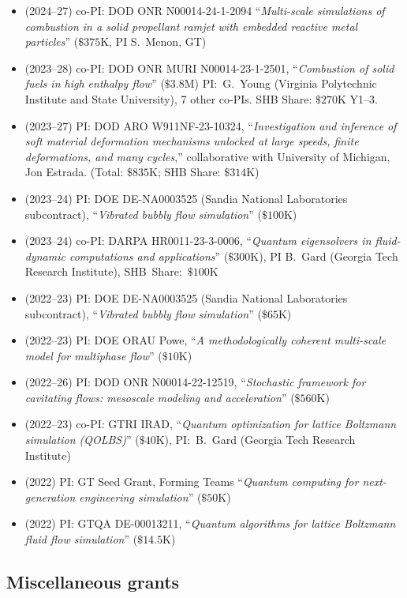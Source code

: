 \begin{itemize}
    \item (2024--27) co-PI: DOD ONR N00014-24-1-2094 ``\textit{Multi-scale simulations of combustion in a solid propellant ramjet with embedded reactive metal particles}'' ($\$375$K, PI S.\ Menon, GT)
    \item (2023--28) co-PI: DOD ONR MURI N00014-23-1-2501, ``\textit{Combustion of solid fuels in high enthalpy flow}'' ($\$3.8$M) PI:~G.~Young (Virginia Polytechnic Institute and State University), 7 other co-PIs. SHB Share: $\$270$K Y1--3.
    \item (2023--27) PI: DOD ARO W911NF-23-10324, ``\textit{Investigation and inference of soft material deformation mechanisms unlocked at large speeds, finite deformations, and many cycles},'' collaborative with University of Michigan, Jon Estrada. (Total: $\$835$K; SHB Share: $\$314$K)
    \item (2023--24) PI: DOE DE-NA0003525 (Sandia National Laboratories subcontract), ``\textit{Vibrated bubbly flow simulation}'' ($\$100$K)
    \item (2023--24) co-PI: DARPA HR0011-23-3-0006, ``\textit{Quantum eigensolvers in fluid-dynamic computations and applications}'' ($\$300$K), PI B.~Gard (Georgia Tech Research Institute), SHB~Share:~$\$100$K
    \item (2022--23) PI: DOE DE-NA0003525 (Sandia National Laboratories subcontract), ``\textit{Vibrated bubbly flow simulation}'' ($\$65$K)
    \item (2022--23) PI: DOE ORAU Powe, ``\textit{A methodologically coherent multi-scale model for multiphase flow}'' ($\$10$K)
    \item (2022--26) PI: DOD ONR N00014-22-12519, ``\textit{Stochastic framework for cavitating flows: mesoscale modeling and acceleration}'' ($\$560$K)
    \item (2022--23) co-PI: GTRI IRAD, ``\textit{Quantum optimization for lattice Boltzmann simulation (QOLBS)}'' ($\$40$K), PI:~B.~Gard (Georgia Tech Research Institute)
    \item (2022) PI: GT Seed Grant, Forming Teams ``\textit{Quantum computing for next-generation engineering simulation}'' ($\$50$K)
    \item (2022) PI: GTQA DE-00013211, ``\textit{Quantum algorithms for lattice Boltzmann fluid flow simulation}'' ($\$14.5$K)
\end{itemize}

\subsection{Miscellaneous grants}


